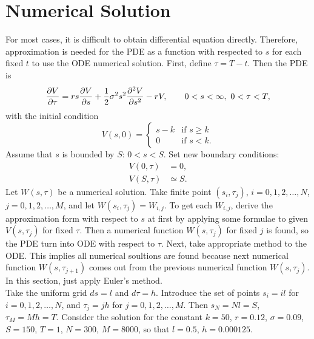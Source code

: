 \section{Numerical Solution}
	For most cases, it is difficult to obtain differential equation directly. Therefore, approximation is needed for the PDE as a function with respected to $s$ for each fixed $t$ to use the ODE numerical solution. First, define $\tau = T-t$. Then the PDE is 
	\begin{equation}
		\frac{\partial V}{\partial\tau}=rs\frac{\partial V}{\partial s} + \frac{1}{2}\sigma^2s^2\frac{\partial^{2}V}{\partial s^{2}}-rV, \qquad 0 < s < \infty,\ 0 < \tau < T, \label{origin}
	\end{equation}
	with the initial condition
	\begin{equation*}
		V(s,0) =
		\begin{cases}
			s-k & \mbox{if } s \ge k \\
			0 & \mbox{if } s < k.
		\end{cases}
	\end{equation*}
	Assume that $s$ is bounded by $S$: $0<s<S$. Set new boundary conditions:
	\begin{align*}
		V(0,\tau) &= 0,\\
		V(S,\tau) &\simeq S.
	\end{align*}
	Let $W(s,\tau)$ be a numerical solution. Take finite point $(s_i, \tau_j)$, $i=0,1,2,\dots,N$, $j=0,1,2,\dots,M$, and let $W(s_i,\tau_j) = W_{i,j}$. To get each $W_{i,j}$, derive the approximation form with respect to $s$ at first by applying some formulae to given $V(s,\tau_j)$ for fixed $\tau$. Then a numerical function $W(s,\tau_j)$ for fixed $j$ is found, so the PDE turn into ODE with respect to $\tau$. Next, take appropriate method to the ODE. This implies all numerical soultions are found because next numerical function $W(s,\tau_{j+1})$ comes out from the previous numerical function $W(s,\tau_j)$. In this section, just apply Euler's method.\\
	Take the uniform grid $ds = l$ and $d\tau = h$. Introduce the set of points $s_i = il$ for $i=0,1,2,\dots,N$, and $\tau_j = jh$ for $j=0,1,2,\dots,M$. Then $s_N = Nl = S$, $\tau_M = Mh = T$. Consider the solution for the constant $k=50$, $r=0.12$, $\sigma=0.09$, $S=150$, $T=1$, $N=300$, $M=8000$, so that $l=0.5$, $h=0.000125$.\\
	
